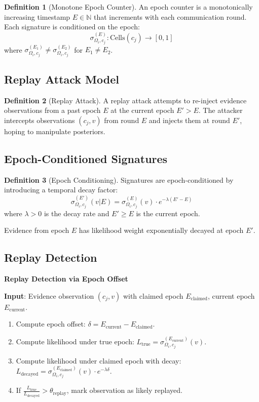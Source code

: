 \documentclass[11pt,a4paper]{article}
\theoremstyle{definition}
\newtheorem{definition}{Definition}[section]
\begin{document}
\begin{definition}[Monotone Epoch Counter]
An epoch counter is a monotonically increasing timestamp $E \in \mathbb{N}$ that increments with each communication round. Each signature is conditioned on the epoch:
\[
\sigma_{\Omega_i, c_j}^{(E)} : \text{Cells}(c_j) \to [0,1]
\]
where $\sigma_{\Omega_i, c_j}^{(E_1)} \neq \sigma_{\Omega_i, c_j}^{(E_2)}$ for $E_1 \neq E_2$.
\end{definition}

\subsection{Replay Attack Model}

\begin{definition}[Replay Attack]
A replay attack attempts to re-inject evidence observations from a past epoch $E$ at the current epoch $E' > E$. The attacker intercepts observations $(c_j, v)$ from round $E$ and injects them at round $E'$, hoping to manipulate posteriors.
\end{definition}

\subsection{Epoch-Conditioned Signatures}

\begin{definition}[Epoch Conditioning]
Signatures are epoch-conditioned by introducing a temporal decay factor:
\[
\sigma_{\Omega_i, c_j}^{(E')}(v | E) = \sigma_{\Omega_i, c_j}^{(E)}(v) \cdot e^{-\lambda(E' - E)}
\]
where $\lambda > 0$ is the decay rate and $E' \geq E$ is the current epoch.

Evidence from epoch $E$ has likelihood weight exponentially decayed at epoch $E'$.
\end{definition}

\subsection{Replay Detection}

\begin{algorithm}
\textbf{Replay Detection via Epoch Offset}

\textbf{Input}: Evidence observation $(c_j, v)$ with claimed epoch $E_{\text{claimed}}$, current epoch $E_{\text{current}}$.

\begin{enumerate}
\item Compute epoch offset: $\delta = E_{\text{current}} - E_{\text{claimed}}$.
\item Compute likelihood under true epoch: $L_{\text{true}} = \sigma_{\Omega_i, c_j}^{(E_{\text{current}})}(v)$.
\item Compute likelihood under claimed epoch with decay: $L_{\text{decayed}} = \sigma_{\Omega_i, c_j}^{(E_{\text{claimed}})}(v) \cdot e^{-\lambda \delta}$.
\item If $\frac{L_{\text{true}}}{L_{\text{decayed}}} > \theta_{\text{replay}}$, mark observation as likely replayed.
\end{enumerate}
\end{algorithm}
\end{document}
